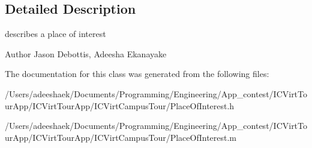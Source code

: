 \subsection{Detailed Description}
describes a place of interest 

\begin{DoxyAuthor}{Author}
Jason Debottis, Adeesha Ekanayake 
\end{DoxyAuthor}


The documentation for this class was generated from the following files\-:\begin{DoxyCompactItemize}
\item 
/\-Users/adeeshaek/\-Documents/\-Programming/\-Engineering/\-App\-\_\-contest/\-I\-C\-Virt\-Tour\-App/\-I\-C\-Virt\-Tour\-App/\-I\-C\-Virt\-Campus\-Tour/Place\-Of\-Interest.\-h\item 
/\-Users/adeeshaek/\-Documents/\-Programming/\-Engineering/\-App\-\_\-contest/\-I\-C\-Virt\-Tour\-App/\-I\-C\-Virt\-Tour\-App/\-I\-C\-Virt\-Campus\-Tour/Place\-Of\-Interest.\-m\end{DoxyCompactItemize}
